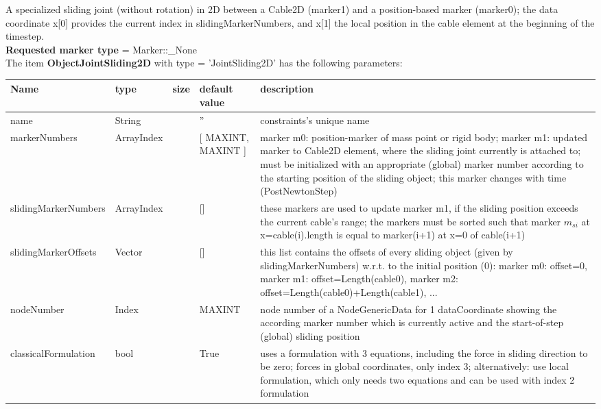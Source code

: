 A specialized sliding joint (without rotation) in 2D between a Cable2D (marker1) and a position-based marker (marker0); the data coordinate x[0] provides the current index in slidingMarkerNumbers, and x[1] the local position in the cable element at the beginning of the timestep.
 \\  {\bf Requested marker type} = Marker::\_None \\ 
\vspace{12pt} \noindent The item {\bf ObjectJointSliding2D} with type = 'JointSliding2D' has the following parameters:\vspace{-1cm}\\ 
\begin{center}
  \footnotesize
  \begin{longtable}{| p{4.5cm} | p{2.5cm} | p{0.5cm} | p{2.5cm} | p{6cm} |}
    \hline
    \bf Name & \bf type & \bf size & \bf default value & \bf description \\ \hline
    name &     String &      &     '' &     constraints's unique name\\ \hline
    markerNumbers &     ArrayIndex &      &     [ MAXINT, MAXINT ] &     marker m0: position-marker of mass point or rigid body; marker m1: updated marker to Cable2D element, where the sliding joint currently is attached to; must be initialized with an appropriate (global) marker number according to the starting position of the sliding object; this marker changes with time (PostNewtonStep)\\ \hline
    slidingMarkerNumbers &     ArrayIndex &      &     [] &     these markers are used to update marker m1, if the sliding position exceeds the current cable's range; the markers must be sorted such that marker $m_{si}$ at x=cable(i).length is equal to marker(i+1) at x=0 of cable(i+1)\\ \hline
    slidingMarkerOffsets &     Vector &      &     [] &     this list contains the offsets of every sliding object (given by slidingMarkerNumbers) w.r.t. to the initial position (0): marker m0: offset=0, marker m1: offset=Length(cable0), marker m2: offset=Length(cable0)+Length(cable1), ...\\ \hline
    nodeNumber &     Index &      &     MAXINT &     node number of a NodeGenericData for 1 dataCoordinate showing the according marker number which is currently active and the start-of-step (global) sliding position\\ \hline
    classicalFormulation &     bool &      &     True &     uses a formulation with 3 equations, including the force in sliding direction to be zero; forces in global coordinates, only index 3; alternatively: use local formulation, which only needs two equations and can be used with index 2 formulation\\ \hline

\end{longtable}
\end{center}

